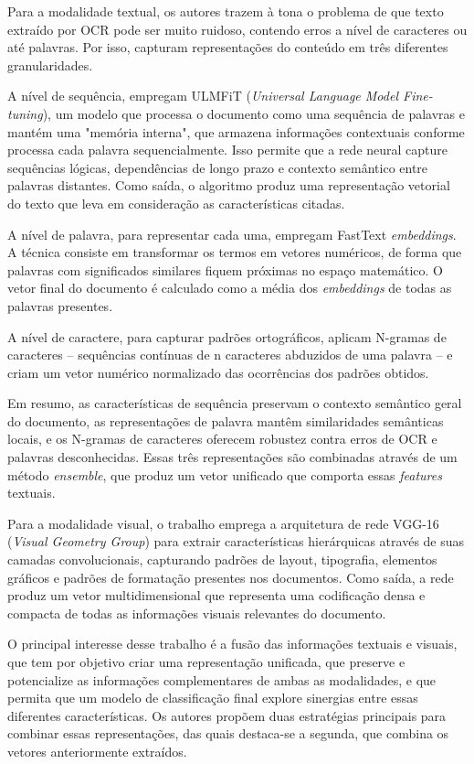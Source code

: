 Para a modalidade textual, os autores trazem à tona o problema de que texto extraído por OCR pode ser muito ruidoso, contendo erros a nível de caracteres ou até palavras. Por isso, capturam representações do conteúdo em três diferentes granularidades. 

A nível de sequência, empregam ULMFiT (\textit{Universal Language Model Fine-tuning}), um modelo que processa o documento como uma sequência de palavras e mantém uma "memória interna", que armazena informações contextuais conforme processa cada palavra sequencialmente. Isso permite que a rede neural capture sequências lógicas, dependências de longo prazo e contexto semântico entre palavras distantes. Como saída, o algoritmo produz uma representação vetorial do texto que leva em consideração as características citadas.

A nível de palavra, para representar cada uma, empregam FastText \textit{embeddings}. A técnica consiste em transformar os termos em vetores numéricos, de forma que palavras com significados similares fiquem próximas no espaço matemático. O vetor final do documento é calculado como a média dos \textit{embeddings} de todas as palavras presentes.

A nível de caractere, para capturar padrões ortográficos, aplicam N-gramas de caracteres -- sequências contínuas de n caracteres abduzidos de uma palavra -- e criam um vetor numérico normalizado das ocorrências dos padrões obtidos.

Em resumo, as características de sequência preservam o contexto semântico geral do documento, as representações de palavra mantêm similaridades semânticas locais, e os N-gramas de caracteres oferecem robustez contra erros de OCR e palavras desconhecidas. Essas três representações são combinadas através de um método \textit{ensemble}, que produz um vetor unificado que comporta essas \textit{features} textuais.

Para a modalidade visual, o trabalho emprega a arquitetura de rede VGG-16 (\textit{Visual Geometry Group}) para extrair características hierárquicas através de suas camadas convolucionais, capturando padrões de layout, tipografia, elementos gráficos e padrões de formatação presentes nos documentos. Como saída, a rede produz um vetor multidimensional que representa uma codificação densa e compacta de todas as informações visuais relevantes do documento.

O principal interesse desse trabalho é a fusão das informações textuais e visuais, que tem por objetivo criar uma representação unificada, que preserve e potencialize as informações complementares de ambas as modalidades, e que permita que um modelo de classificação final explore sinergias entre essas diferentes características. Os autores propõem duas estratégias principais para combinar essas representações, das quais destaca-se a segunda, que combina os vetores anteriormente extraídos.

